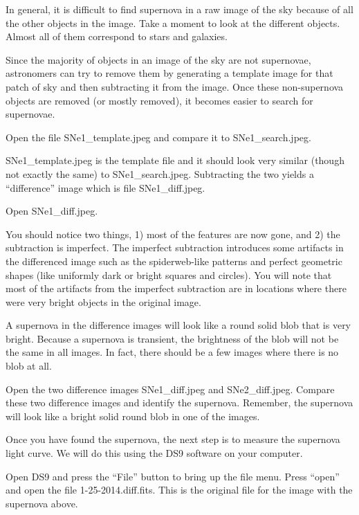 In general, it is difficult to find supernova in a raw image of the sky
because of all the other objects in the image. Take a moment to look at
the different objects. Almost all of them correspond to stars
and galaxies.

Since the majority of objects in an image of the sky are not supernovae,
astronomers can try to remove them by generating a template image for
that patch of sky and then subtracting it from the image. Once these
non-supernova objects are removed (or mostly removed), it becomes
easier to search for supernovae.

\begin{steps}
	\item Open the file SNe1\_template.jpeg and compare it to SNe1\_search.jpeg.
\end{steps}
SNe1\_template.jpeg is the template file and it should look very similar
(though not exactly the same) to SNe1\_search.jpeg. Subtracting the two
yields a “difference” image which is file SNe1\_diff.jpeg.
\begin{steps}
	\item Open SNe1\_diff.jpeg.
\end{steps}
You should notice two things, 1) most of the features are now gone, and 2) the subtraction is imperfect. The imperfect subtraction introduces some artifacts in the differenced
image such as the spiderweb-like patterns and perfect geometric shapes
(like uniformly dark or bright squares and circles). You will note that
most of the artifacts from the imperfect subtraction are in locations
where there were very bright objects in the original image.

A supernova in the difference images will look like a round solid blob
that is very bright. Because a supernova is transient, the brightness of
the blob will not be the same in all images. In fact, there should be a few
images where there is no blob at all.

\begin{steps}
	\item Open the two difference images SNe1\_diff.jpeg and SNe2\_diff.jpeg.
	Compare these two difference images and identify the supernova.
	Remember, the supernova will look like a bright solid round blob in one
	of the images.
\end{steps}

Once you have found the supernova, the next step is to measure the
supernova light curve. We will do this using the DS9 software on your
computer.
\begin{steps}
	\item Open DS9 and press the “File” button to bring up the file
	menu. Press “open” and open the file 1-25-2014.diff.fits. This is the
	original file for the image with the supernova above.
\end{steps}

